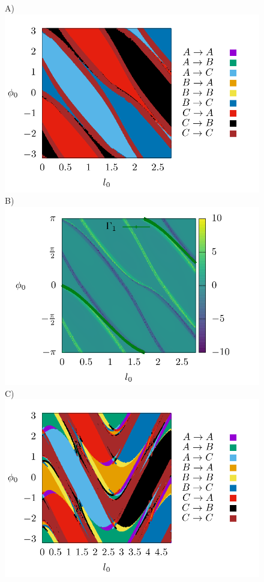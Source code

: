 \documentclass[10pt,aps,onecolumn,superscriptaddress]{revtex4-2}
\begin{document}
\begin{figure}[htbp]
	A)\includegraphics[scale=0.35]{fate_map_ds_gamma1E_0019.png}
	B)\includegraphics[scale=0.35]{ld_action_ds_gamma1_E_0019.png}
	C)\includegraphics[scale=0.35]{fate_map_ds_gamma2E_0019.png}

\end{figure}
\end{document}
